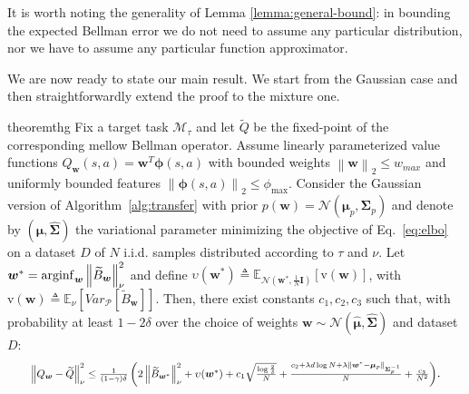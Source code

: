 \documentclass{article}
\newcommand{\arginf}{\operatornamewithlimits{arginf}}
\newcommand{\wt}[1]{\widetilde{#1}}
\newcommand{\wh}[1]{\widehat{#1}}
\newcommand{\norm}[1]{\left\lVert #1 \right\rVert}
\begin{document}
It is worth noting the generality of Lemma \ref{lemma:general-bound}: in bounding the expected Bellman error we do not need to assume any particular distribution, nor we have to assume any particular function approximator.

We are now ready to state our main result. We start from the Gaussian case and then straightforwardly extend the proof to the mixture one.

\begin{restatable}{theorem}{thg} \label{th:main-gaussian}
Fix a target task $\mathcal{M}_{\tau}$ and let $\wt{Q}$ be the fixed-point of the corresponding mellow Bellman operator. Assume linearly parameterized value functions $Q_{\bm{w}}(s,a)=\bm{w}^T\bm{\phi}(s,a)$ with bounded weights $\norm{\bm{w}}_{2}\leq w_{max}$ and uniformly bounded features $\norm{\bm{\phi}(s,a)}_{2}\leq \phi_{\max}$. Consider the Gaussian version of Algorithm~\ref{alg:transfer} with prior $p(\bm{w}) =\mathcal{N}(\bm{\mu}_p,\bm{\Sigma}_p)$ and denote by $(\wh{\bm{\mu}},\wh{\bm{\Sigma}})$ the variational parameter minimizing the objective of Eq.~\eqref{eq:elbo} on a dataset $D$ of $N$ i.i.d. samples distributed according to $\tau$ and $\nu$. Let $\bm{w}^* = \arginf_{\bm{w}}\norm{\wt{B}_{\bm{w}}}_{\nu}^2$ and define $\upsilon(\bm{w}^*) \triangleq \mathbb{E}_{\mathcal{N}(\bm{w}^*,\frac{1}{N}\bm{I})}\left[ \text{v}(\bm{w}) \right]$, with $\text{v}(\bm{w}) \triangleq \mathbb{E}_{\nu}\left[Var_{\mathcal{P}}\left[\wt B_{\bm{w}}\right]\right]$. Then, there exist constants $c_1,c_2,c_3$ such that, with probability at least $1-2\delta$ over the choice of weights $\bm{w} \sim \mathcal{N}(\wh{\bm{\mu}},\wh{\bm{\Sigma}})$ and dataset $D$:
\begin{equation}
\resizebox{0.93\textwidth}{!}{$
\norm{Q_{\bm{w}} - \wt{Q}}_{\nu}^2 \leq \frac{1}{(1-\gamma)\delta}\left(2\norm{\wt{B}_{\bm{w}^{*}}}_{\nu}^2 + \upsilon(\bm{w}^*) + c_1\sqrt{\frac{\log\frac{2}{\delta}}{N}} + \frac{c_2 + \lambda d \log N + \lambda\norm{\bm{w}^* - \bm{\mu}_p}_{\bm{\Sigma}_p^{-1}}}{N} + \frac{c_3}{N^2}\right)$}.
\end{equation}
\end{restatable}
\end{document}
